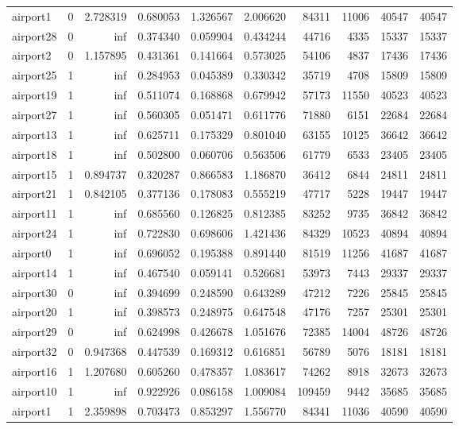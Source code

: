 \begin{longtable}{|l|r|r|r|r|r|r|r|r|r|}
airport1 & 0 & 2.728319 & 0.680053 & 1.326567 & 2.006620 & 84311 & 11006 & 40547 & 40547 \\
airport28 & 0 & inf & 0.374340 & 0.059904 & 0.434244 & 44716 & 4335 & 15337 & 15337 \\
airport2 & 0 & 1.157895 & 0.431361 & 0.141664 & 0.573025 & 54106 & 4837 & 17436 & 17436 \\
airport25 & 1 & inf & 0.284953 & 0.045389 & 0.330342 & 35719 & 4708 & 15809 & 15809 \\
airport19 & 1 & inf & 0.511074 & 0.168868 & 0.679942 & 57173 & 11550 & 40523 & 40523 \\
airport27 & 1 & inf & 0.560305 & 0.051471 & 0.611776 & 71880 & 6151 & 22684 & 22684 \\
airport13 & 1 & inf & 0.625711 & 0.175329 & 0.801040 & 63155 & 10125 & 36642 & 36642 \\
airport18 & 1 & inf & 0.502800 & 0.060706 & 0.563506 & 61779 & 6533 & 23405 & 23405 \\
airport15 & 1 & 0.894737 & 0.320287 & 0.866583 & 1.186870 & 36412 & 6844 & 24811 & 24811 \\
airport21 & 1 & 0.842105 & 0.377136 & 0.178083 & 0.555219 & 47717 & 5228 & 19447 & 19447 \\
airport11 & 1 & inf & 0.685560 & 0.126825 & 0.812385 & 83252 & 9735 & 36842 & 36842 \\
airport24 & 1 & inf & 0.722830 & 0.698606 & 1.421436 & 84329 & 10523 & 40894 & 40894 \\
airport0 & 1 & inf & 0.696052 & 0.195388 & 0.891440 & 81519 & 11256 & 41687 & 41687 \\
airport14 & 1 & inf & 0.467540 & 0.059141 & 0.526681 & 53973 & 7443 & 29337 & 29337 \\
airport30 & 0 & inf & 0.394699 & 0.248590 & 0.643289 & 47212 & 7226 & 25845 & 25845 \\
airport20 & 1 & inf & 0.398573 & 0.248975 & 0.647548 & 47176 & 7257 & 25301 & 25301 \\
airport29 & 0 & inf & 0.624998 & 0.426678 & 1.051676 & 72385 & 14004 & 48726 & 48726 \\
airport32 & 0 & 0.947368 & 0.447539 & 0.169312 & 0.616851 & 56789 & 5076 & 18181 & 18181 \\
airport16 & 1 & 1.207680 & 0.605260 & 0.478357 & 1.083617 & 74262 & 8918 & 32673 & 32673 \\
airport10 & 1 & inf & 0.922926 & 0.086158 & 1.009084 & 109459 & 9442 & 35685 & 35685 \\
airport1 & 1 & 2.359898 & 0.703473 & 0.853297 & 1.556770 & 84341 & 11036 & 40590 & 40590 \\

\end{longtable}
